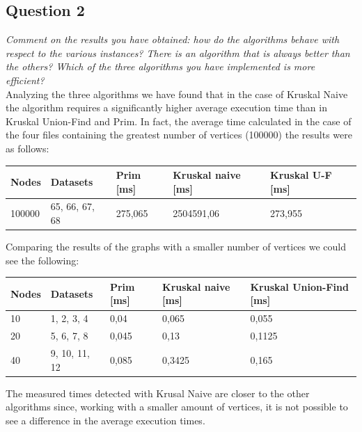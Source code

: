 \subsection{Question 2}
\textit{Comment on the results you have obtained: how do the algorithms behave with respect to the various 
instances? There is an algorithm that is always better than the others? Which of the three algorithms you 
have implemented is more efficient?} \\

\noindent
Analyzing the three algorithms we have found that in the case of Kruskal Naive the algorithm requires a 
significantly higher average execution time than in Kruskal Union-Find and Prim. In fact, the average time 
calculated in the case of the four files containing the greatest number of vertices (100000) the results 
were as follows:
\begin{table}[H]\centering
    \begin{tabular}{l|l|l|l|l}
        \textbf{Nodes} & \textbf{Datasets} & \textbf{Prim [ms]} & \textbf{Kruskal naive [ms]} & \textbf{Kruskal U-F [ms]}\\
    \hline
        100000 & 65, 66, 67, 68 & 275,065 & 2504591,06 & 273,955 
    \end{tabular}
\end{table}
\noindent
Comparing the results of the graphs with a smaller number of vertices we could see the following:
\begin{table}[H]\centering
    \begin{tabular}{l|l|l|l|l}
        \textbf{Nodes} & \textbf{Datasets} & \textbf{Prim [ms]} & \textbf{Kruskal naive [ms]} & \textbf{Kruskal Union-Find [ms]} \\
    \hline
        10 & 1, 2, 3, 4     & 0,04  & 0,065  & 0,055  \\
        20 & 5, 6, 7, 8     & 0,045  & 0,13  & 0,1125   \\
        40 & 9, 10, 11, 12  & 0,085  & 0,3425  & 0,165  \\
    \end{tabular}
\end{table}
\noindent
The measured times detected with Krusal Naive are closer to the other algorithms since, working with 
a smaller amount of vertices, it is not possible to see a difference in the average execution times.

